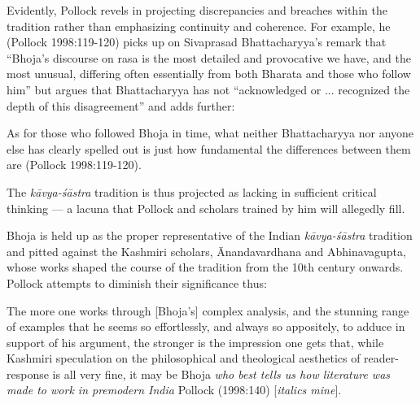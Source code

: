 Evidently, Pollock revels in projecting discrepancies and breaches with\-in the tradition rather than emphasizing continuity and coherence. For example, he (Pollock 1998:119-120) picks up on Sivaprasad Bhattacharyya's remark that ``Bhoja's discourse on rasa is the most detailed and provocative we have, and the most unusual, differing often essentially from both Bharata and those who follow him'' but argues that Bhattacharyya has not ``acknowledged or ... recognized the depth of this disagreement'' and adds further:

\begin{myquote}
As for those who followed Bhoja in time, what neither Bhattacharyya nor anyone else has clearly spelled out is just how fundamental the differences between them are 
\hfill (Pollock 1998:119-120).  
\end{myquote}


The \textsl{kāvya-śāstra} tradition is thus projected as lacking in sufficient critical thinking --- a lacuna that Pollock and scholars trained by him will allegedly fill.

Bhoja is held up as the proper representative of the Indian \textsl{kāvya-śāstra} tradition and pitted against the Kashmiri scholars, Ānandavardhana and Abhinavagupta, whose works shaped the course of the tradition from the 10th century onwards. Pollock attempts to diminish their significance thus:

\begin{myquote}
The more one works through [Bhoja's] complex analysis, and the stunning range of examples that he seems so effortlessly, and always so appositely, to adduce in support of his argument, the stronger is the impression one gets that, while Kashmiri speculation on the philosophical and theological aesthetics of reader-response is all very fine, it may be Bhoja \textsl{who best tells us how literature was made to work in premodern India} 
\hfill Pollock (1998:140) [\textsl{italics mine}].
\end{myquote}

